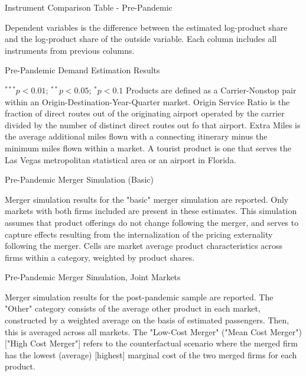\documentclass{article}
\begin{document}
\begin{appendices}
	\begin{landscape}
		\begin{table}
			\caption{Instrument Comparison Table - Pre-Pandemic}
			\label{tab:Instrument_Compare_Pre}
			
			\footnotesize{Dependent variables is the difference between the estimated log-product share and the log-product share of the outside variable. Each column includes all instruments from previous columns.}
		\end{table}
	\end{landscape}
	
	
	\begin{table}
		\caption{Pre-Pandemic Demand Estimation Results}
		\label{tab:Results_PrePandemic}
		
		\footnotesize{$^{***}p<0.01$; $^{**}p<0.05$; $^{*}p<0.1$ Products are defined as a Carrier-Nonstop pair within an Origin-Destination-Year-Quarter market. Origin Service Ratio is the fraction of direct routes out of the originating airport operated by the carrier divided by the number of distinct direct routes out fo that airport. Extra Miles is the average additional miles flown with a connecting itinerary minus the minimum miles flown within a market.  A tourist product is one that serves the Las Vegas metropolitan statistical area or an airport in Florida.}
	\end{table}
	
	\begin{table}
		\caption{Pre-Pandemic Merger Simulation (Basic)}
		\label{tab:Simulation_Pre_Basic}
		
		\footnotesize{Merger simulation results for the "basic" merger simulation are reported. Only markets with both firms included are present in these estimates. This simulation assumes that product offerings do not change following the merger, and serves to capture effects resulting from the internalization of the pricing externality following the merger. Cells are market average product characteristics across firms within a category, weighted by product shares.}
	\end{table}
	
	\begin{landscape}
		\begin{table}
			\caption{Pre-Pandemic Merger Simulation, Joint Markets}
			\label{tab:Simulation_Pre}
			
			\footnotesize{Merger simulation results for the post-pandemic sample are reported. The "Other" category consists of the average other product in each market, constructed by a weighted average on the basis of estimated passengers. Then, this is averaged across all markets. The "Low-Cost Merger" ("Mean Cost Merger") ["High Cost Merger"] refers to the counterfactual scenario where the merged firm has the lowest (average) [highest] marginal cost of the two merged firms for each product.}
		\end{table}
	\end{landscape}


\end{appendices}
\end{document}
